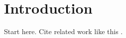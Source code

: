 \chapter{Introduction}
\label{ch:introduction}

Start here. Cite related work like this \citep{knuth1984}.
